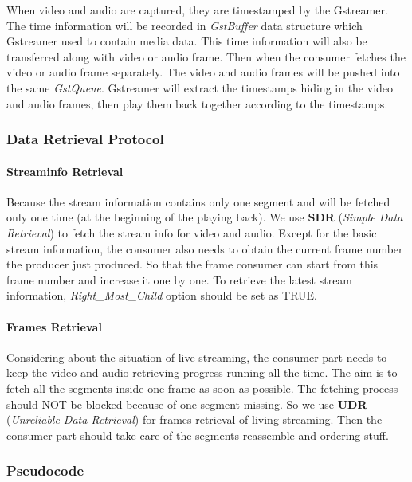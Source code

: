 When video and audio are captured, they are timestamped by the Gstreamer. The time information will be recorded in \textit{GstBuffer} data structure which Gstreamer used to contain media data. This time information will also be transferred along with video or audio frame. Then when the consumer fetches the video or audio frame separately. The video and audio frames will be pushed into the same \textit{GstQueue}. Gstreamer will extract the timestamps hiding in the video and audio frames, then play them back together according to the timestamps.

\subsubsection{Data Retrieval Protocol}
\paragraph{Streaminfo Retrieval} %
\label{par:streaminfo}
Because the stream information contains only one segment and will be fetched only one time (at the beginning of the playing back). We use \textbf{SDR} (\textit{Simple Data Retrieval}) to fetch the stream info for video and audio. Except for the basic stream information, the consumer also needs to obtain the current frame number the producer just produced. So that the frame consumer can start from this frame number and increase it one by one. To retrieve the latest stream information, \textit{Right\_Most\_Child} option should be set as TRUE.
\paragraph{Frames Retrieval} 
Considering about the situation of live streaming, the consumer part needs to keep the video and audio retrieving progress running all the time. The aim is to fetch all the segments inside one frame as soon as possible. The fetching process should NOT be blocked because of one segment missing. So we use \textbf{UDR} (\textit{Unreliable Data Retrieval}) for frames retrieval of living streaming. Then the consumer part should take care of the segments reassemble and ordering stuff.

\subsubsection{Pseudocode}


